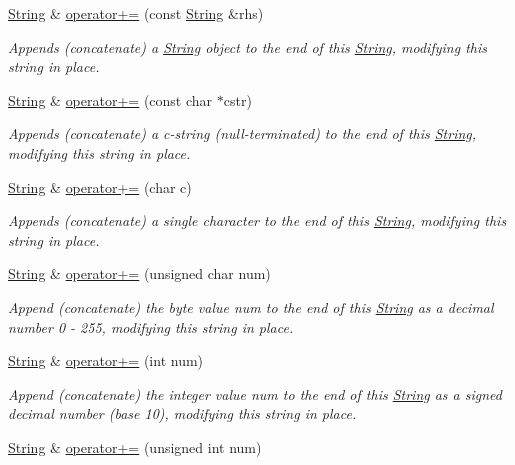 \begin{DoxyCompactItemize}
\hyperlink{class_string}{String} \& \hyperlink{class_string_a5a3f29c49cc46fb598fc41767a83dabc}{operator+=} (const \hyperlink{class_string}{String} \&rhs)
\begin{DoxyCompactList}\small\item\em Appends (concatenate) a \hyperlink{class_string}{String} object to the end of this \hyperlink{class_string}{String}, modifying this string in place. \end{DoxyCompactList}\item 
\hyperlink{class_string}{String} \& \hyperlink{class_string_ab41e81fc0c337cab456509994d12f097}{operator+=} (const char $\ast$cstr)
\begin{DoxyCompactList}\small\item\em Appends (concatenate) a c-\/string (null-\/terminated) to the end of this \hyperlink{class_string}{String}, modifying this string in place. \end{DoxyCompactList}\item 
\hyperlink{class_string}{String} \& \hyperlink{class_string_aea2e862c41c9995a7cb2201cd92c2851}{operator+=} (char c)
\begin{DoxyCompactList}\small\item\em Appends (concatenate) a single character to the end of this \hyperlink{class_string}{String}, modifying this string in place. \end{DoxyCompactList}\item 
\hyperlink{class_string}{String} \& \hyperlink{class_string_a26be7d08426b6cf307f1eb2e9bff095a}{operator+=} (unsigned char num)
\begin{DoxyCompactList}\small\item\em Append (concatenate) the byte value num to the end of this \hyperlink{class_string}{String} as a decimal number 0 -\/ 255, modifying this string in place. \end{DoxyCompactList}\item 
\hyperlink{class_string}{String} \& \hyperlink{class_string_acc979c8832f66d8d953aaa7d81d305c1}{operator+=} (int num)
\begin{DoxyCompactList}\small\item\em Append (concatenate) the integer value num to the end of this \hyperlink{class_string}{String} as a signed decimal number (base 10), modifying this string in place. \end{DoxyCompactList}\item 
\hyperlink{class_string}{String} \& \hyperlink{class_string_aca854f6e679697e98e940b8d2b51956e}{operator+=} (unsigned int num)

\end{DoxyCompactItemize}
